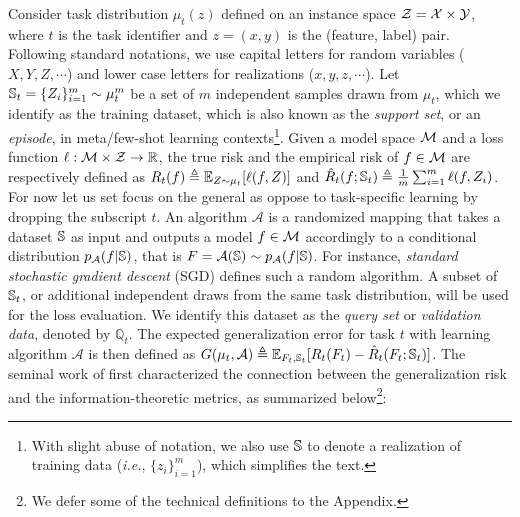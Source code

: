 \documentclass[nohyperref]{article}
\theoremstyle{plain}
\theoremstyle{definition}
\theoremstyle{remark}
\newcommand{\BQ}{\mathbb{Q}}
\newcommand{\CA}{\mathcal{A}}
\begin{document}
Consider task distribution $\mu_t(z)$ defined on an instance space $\mathcal{Z} = \mathcal{X} \times \mathcal{Y}$, where $t$ is the task identifier and $z=(x, y)$ is the (feature, label) pair. Following standard notations, we use capital letters for random variables ($X, Y, Z, \cdots$) and lower case letters for realizations ($x, y, z, \cdots$).  Let $\mathbb{S}_t = \{ Z_i \}_{i=1}^m \sim \mu_t^m$ be a set of $m$ independent samples drawn from $\mu_t$, which we identify as the training dataset, which is also known as the {\it support set}, or an {\it episode}, in meta/few-shot learning contexts\footnote{With slight abuse of notation, we also use $\mathbb{S}$ to denote a realization of training data ({\it i.e.}, $\{ z_i \}_{i=1}^m$), which simplifies the text.}. 
Given a model space $\mathcal{M}$ and a loss function $\ell: \mathcal{M} \times \mathcal{Z} \rightarrow \mathbb{R}$, the true risk and the empirical risk of $f\in \mathcal{M}$ are respectively defined as $R_{t}(f) \triangleq \mathbb{E}_{Z\sim\mu_t}[\ell(f, Z)]$ and $\hat{R}_t(f;\mathbb{S}_t) \triangleq \frac{1}{m} \sum_{i=1}^m \ell(f, Z_i)$. For now let us set focus on the general as oppose to task-specific learning by dropping the subscript $t$. An algorithm $\CA$ is a randomized mapping that takes a dataset $\mathbb{S}$ as input and outputs a model $f\in \mathcal{M}$ accordingly to a conditional distribution $p_{\CA}(f|\BS)$, that is $F=\CA(\BS)\sim p_{\CA}(f|\BS)$. For instance, {\it standard stochastic gradient descent} (SGD) defines such a random algorithm. A subset of $\mathbb{S}_t$, or additional independent draws from the same task distribution, will be used for the loss evaluation. We identify this dataset as the {\it query set} or {\it validation data}, denoted by $\BQ_t$. The expected generalization error for task $t$ with learning algorithm $\CA$ is then defined as $G(\mu_t, \CA)\triangleq \EE_{F_t,\BS_t}[R_t(F_t)-\hat{R}_t(F_t;\BS_t)]$. The seminal work of \citet{xu2017information} first characterized the connection between the generalization risk and the information-theoretic metrics, as summarized below\footnote{We defer some of the technical definitions to the Appendix.}:
\end{document}
